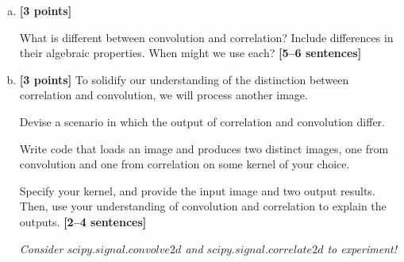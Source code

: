 \documentclass[11pt]{article}
\begin{document}
\begin{enumerate}[(a)]

    \item \textbf{[3 points]} 
    \begin{tcolorbox}[colback=orange!5!white,colframe=orange!75!black]
    What is different between convolution and correlation? Include differences in their algebraic properties. When might we use each? \textbf{[5--6 sentences]}
    \end{tcolorbox}
    

    
    \item \textbf{[3 points]}
    To solidify our understanding of the distinction between correlation and convolution, we will process another image.
    
    \begin{tcolorbox}[colback=orange!5!white,colframe=orange!75!black]
    Devise a scenario in which the output of correlation and convolution differ.
    
    Write code that loads an image and produces two distinct images, one from convolution and one from correlation on some kernel of your choice. 
    
    Specify your kernel, and provide the input image and two output results. Then, use your understanding of convolution and correlation to explain the outputs. \textbf{[2--4 sentences]}
    \end{tcolorbox}
    
    \emph{Consider \href{https://docs.scipy.org/doc/scipy/reference/generated/scipy.signal.convolve2d.html}{$scipy.signal.convolve2d$} and \href{https://docs.scipy.org/doc/scipy/reference/generated/scipy.signal.correlate2d.html}{$scipy.signal.correlate2d$} to experiment!}
    


\end{enumerate}
\end{document}
